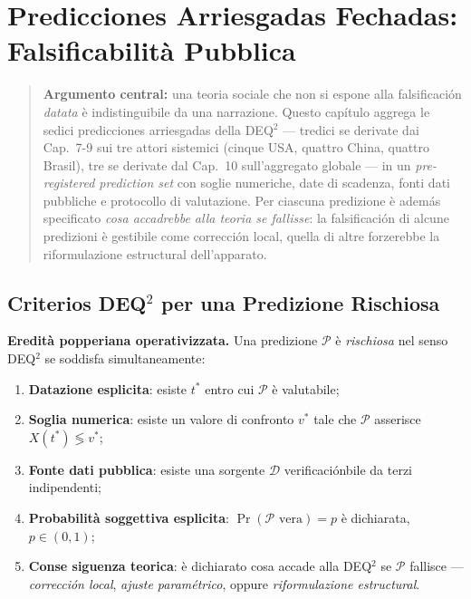 \chapter{Predicciones Arriesgadas Fechadas: Falsificabilità
Pubblica}\label{predizioni-rischiose-datate-falsificabilituxe0-pubblica}

\begin{quote}
\textbf{Argumento central:} una teoria sociale che non si espone alla
falsificación \emph{datata} è indistinguibile da una narrazione. Questo
capítulo aggrega le sedici predicciones arriesgadas della DEQ$^2$ --- tredici
se derivate dai Cap.~7-9 sui tre attori sistemici (cinque USA, quattro
China, quattro Brasil), tre se derivate dal Cap.~10 sull'aggregato globale
--- in un \emph{pre-registered prediction set} con soglie numeriche,
date di scadenza, fonti dati pubbliche e protocollo di valutazione. Per
ciascuna predizione è además specificato \emph{cosa accadrebbe alla
teoria se fallisse}: la falsificación di alcune predizioni è gestibile
come corrección local, quella di altre forzerebbe la riformulazione
estructural dell'apparato.
\end{quote}



\section{Criterios DEQ$^2$ per una Predizione
Rischiosa}\label{criteri-dequxb2-per-una-predizione-rischiosa}

\Hypoth{} \textbf{Eredità popperiana operativizzata.} Una predizione
\(\mathcal{P}\) è \emph{rischiosa} nel senso DEQ$^2$ se soddisfa
simultaneamente:

\begin{enumerate}
\def\labelenumi{\arabic{enumi}.}
\tightlist
\item
  \textbf{Datazione esplicita}: esiste \(t^*\) entro cui \(\mathcal{P}\)
  è valutabile;
\item
  \textbf{Soglia numerica}: esiste un valore di confronto \(v^*\) tale
  che \(\mathcal{P}\) asserisce \(X(t^*) \lessgtr v^*\);
\item
  \textbf{Fonte dati pubblica}: esiste una sorgente \(\mathcal{D}\)
  verificaciónbile da terzi indipendenti;
\item
  \textbf{Probabilità soggettiva esplicita}:
  \(\Pr(\mathcal{P} \text{ vera}) = p\) è dichiarata, \(p \in (0, 1)\);
\item
  \textbf{Conse siguenza teorica}: è dichiarato cosa accade alla DEQ$^2$ se
  \(\mathcal{P}\) fallisce --- \emph{corrección local},
  \emph{ajuste paramétrico}, oppure \emph{riformulazione
  estructural}.
\end{enumerate}

